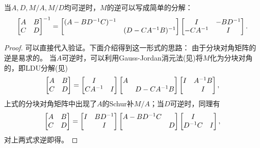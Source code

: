 \begin{theorem}
	\tcblower 
	当$A,D,M/A,M/D$均可逆时，$M$的逆可以写成简单的分解：
	\begin{eqnarray}
		\begin{bmatrix}
			A&B\\C&D
		\end{bmatrix}^{-1}=\begin{bmatrix}
			(A-BD^{-1} C)^{-1}\\ &(D-CA^{-1} B)^{-1}
		\end{bmatrix}\begin{bmatrix}
			I&-BD^{-1}\\-CA^{-1}&I
		\end{bmatrix}.
	\end{eqnarray}
\end{theorem}

\begin{proof}
	可以直接代入验证。下面介绍得到这一形式的思路：
	由于分块对角矩阵的逆是易求的。
	当$A$可逆时，可以利用Gauss-Jordan消元法(见)将$M$化为分块对角的，即LDU分解(见)
	\[
		\begin{bmatrix}
			A&B\\C&D
		\end{bmatrix}=\begin{bmatrix}
			I\\CA^{-1}&I
		\end{bmatrix}\begin{bmatrix}
			A\\ &D-CA^{-1} B
		\end{bmatrix}\begin{bmatrix}
			I&A^{-1} B\\ &I
		\end{bmatrix},
	\]
	上式的分块对角矩阵中出现了$A$的Schur补$M/A$；当$D$可逆时，同理有
	\[
		\begin{bmatrix}
			A&B\\C&D
		\end{bmatrix}=\begin{bmatrix}
			I&BD^{-1}\\ &I
		\end{bmatrix}\begin{bmatrix}
			A-BD^{-1} C\\ &D
		\end{bmatrix}\begin{bmatrix}
			I\\D^{-1} C&I
		\end{bmatrix},
	\]
	对上两式求逆即得。
\end{proof}

